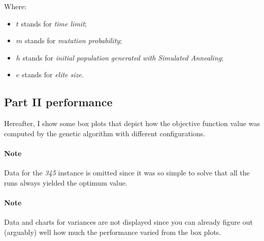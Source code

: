Where:
\begin{itemize}
  \item $t$ stands for \textit{time limit};
  \item $m$ stands for \textit{mutation probability};
  \item $h$ stands for \textit{initial population generated with Simulated
    Annealing};
  \item $e$ stands for \textit{elite size}.
\end{itemize}

\subsection{Part II performance}

Hereafter, I show some box plots that depict how the objective function value
was computed by the genetic algorithm with different configurations.

\paragraph{Note} Data for the \textit{345} instance is omitted since it was so
simple to solve that all the runs always yielded the optimum value.

\paragraph{Note} Data and charts for variances are not displayed since you can
already figure out (arguably) well how much the performance varied from the box
plots.


